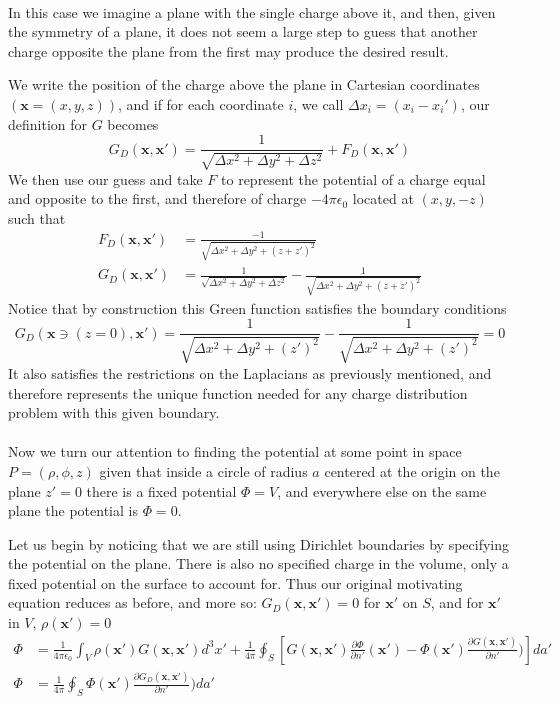\documentclass{article}
\begin{document}
\paragraph{}
In this case we imagine a plane with the single charge above it, and then, given the symmetry of a plane, it does not seem a large step to guess that another charge opposite the plane from the first may produce the desired result.

We write the position of the charge above the plane in Cartesian coordinates $(\mathbf{x}=(x,y,z))$, and if for each coordinate $i$, we call $\Delta x_{i}=(x_{i}-x_{i}')$, our definition for $G$ becomes
\[ G_{D}(\mathbf{x},\mathbf{x'}) = \frac{1}{\sqrt{\Delta x^{2}+\Delta y^{2}+\Delta z^{2}}} + F_{D}(\mathbf{x},\mathbf{x'}) \]
We then use our guess and take $F$ to represent the potential of a charge equal and opposite to the first, and therefore of charge $-4\pi\epsilon_{0}$ located at $(x,y,-z)$ such that
\begin{align*}
F_{D}(\mathbf{x},\mathbf{x'}) &= \frac{-1}{\sqrt{\Delta x^{2}+\Delta y^{2}+(z+z')^{2}}}\\
G_{D}(\mathbf{x},\mathbf{x'}) &= \boxed{\frac{1}{\sqrt{\Delta x^{2}+\Delta y^{2}+\Delta z^{2}}} - \frac{1}{\sqrt{\Delta x^{2}+\Delta y^{2}+(z+z')^{2}}}}
\end{align*}
Notice that by construction this Green function satisfies the boundary conditions
\[ G_{D}(\mathbf{x}\ni(z=0),\mathbf{x'}) = \frac{1}{\sqrt{\Delta x^{2}+\Delta y^{2}+(z')^{2}}} - \frac{1}{\sqrt{\Delta x^{2}+\Delta y^{2}+(z')^{2}}} = 0 \]
It also satisfies the restrictions on the Laplacians as previously mentioned, and therefore represents the unique function needed for any charge distribution problem with this given boundary.

\paragraph{}
Now we turn our attention to finding the potential at some point in space $P=(\rho,\phi,z)$ given that inside a circle of radius $a$ centered at the origin on the plane $z'=0$ there is a fixed potential $\Phi=V$, and everywhere else on the same plane the potential is $\Phi=0$.

Let us begin by noticing that we are still using Dirichlet boundaries by specifying the potential on the plane. There is also no specified charge in the volume, only a fixed potential on the surface to account for. Thus our original motivating equation reduces as before, and more so: $G_{D}(\mathbf{x},\mathbf{x'})=0$ for $\mathbf{x'}$ on $S$, and for $\mathbf{x'}$ in $V$, $\rho(\mathbf{x'})=0$
\begin{align*}
\Phi &= \frac{1}{4\pi\epsilon_{0}} \int_{V} \rho(\mathbf{x'}) G(\mathbf{x},\mathbf{x'}) d^{3}x' + \frac{1}{4\pi} \oint_{S} \left[ G(\mathbf{x},\mathbf{x'}) \frac{\partial\Phi}{\partial n'}(\mathbf{x'}) -\Phi(\mathbf{x'}) \frac{\partial G(\mathbf{x},\mathbf{x'})}{\partial n'}) \right] da'\\
\Phi &= \frac{1}{4\pi} \oint_{S} \Phi(\mathbf{x'}) \frac{\partial G_{D}(\mathbf{x},\mathbf{x'})}{\partial n'}) da'
\end{align*}
\end{document}
